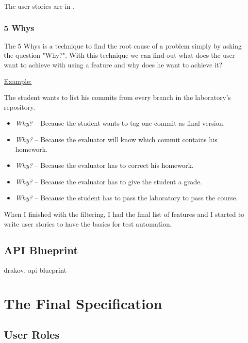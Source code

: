 The user stories are in .

\subsubsection{5 Whys}


The 5 Whys is a technique to find the root cause of a problem simply by asking the question "Why?". With this technique we can find out what does the user want to achieve with using a feature and why does he want to achieve it?

\underline{Example:}

The student wants to list his commits from every branch in the laboratory's repository.
\begin{itemize}
	\item \emph{Why?} -- Because the student wants to tag one commit as final version.
	\item \emph{Why?} -- Because the evaluator will know which commit contains his homework.
	\item \emph{Why?} -- Because the evaluator has to correct his homework.
	\item \emph{Why?} -- Because the evaluator has to give the student a grade.
	\item \emph{Why?} -- Because the student has to pass the laboratory to pass the course.
\end{itemize}

When I finished with the filtering, I had the final list of features  and I started to write user stories to have the basics for test automation.



\subsection{API Blueprint}
\label{api-blueprint}

drakov, api blueprint

\section{The Final Specification} \label{final-spec}
\subsection{User Roles}

